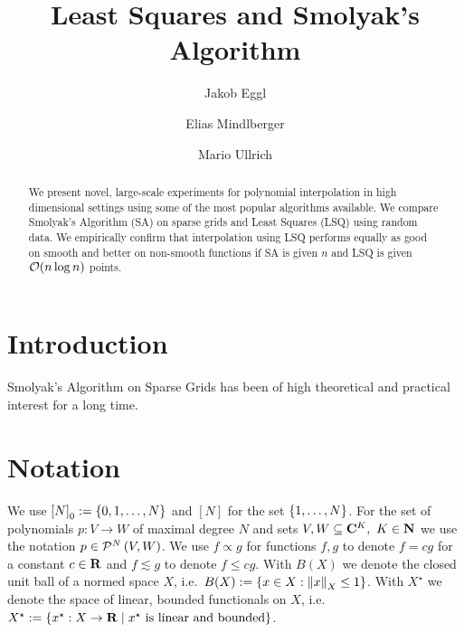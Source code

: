 \documentclass[12pt, oneside]{amsart}
\theoremstyle{definition}
\theoremstyle{remark}
\numberwithin{equation}{section}
\begin{document}
\title{Least Squares and Smolyak's Algorithm}


\author{Jakob Eggl}
\address{Institute of Analysis, Johannes Kepler University Linz, Austria.}

\author{Elias Mindlberger}
\address{Institute of Analysis, Johannes Kepler University Linz, Austria.}

\author{Mario Ullrich}
\address{Institute of Analysis, Johannes Kepler University Linz, Austria.}



\begin{abstract}
We present novel, large-scale experiments for polynomial interpolation in high dimensional settings using some of the most popular algorithms available. We compare Smolyak's Algorithm (SA) on sparse grids and Least Squares (LSQ) using random data. We empirically confirm that interpolation using LSQ performs equally as good on smooth and better on non-smooth functions if SA is given \(n\) and LSQ is given \(\cO(n \log n)\) points.
\end{abstract}


\maketitle
\thispagestyle{empty}


\tableofcontents

\newpage
\section{Introduction}
Smolyak's Algorithm on Sparse Grids has been of high theoretical and practical interest for a long time.


\section{Notation}


We use \({[N]}_0 \defn \set{0, 1, \dots, N}\) and \([N]\) for the set \(\set{1, \dots, N}\). For the set of polynomials \(p: V \to W\) of maximal degree \(N\) and sets \(V, W \subseteq \C^K,\ K \in \N\) we use the notation \(p \in \pols[N]{V, W}\). We use \(f \propto g\) for functions \(f, g\) to denote \(f = c g\) for a constant \(c \in \R\) and \(f \lesssim g\) to denote \(f \leq c g\). With \(B(X)\) we denote the closed unit ball of a normed space \(X\), i.e.\ \(B(X) \defn \set{x \in X: \norm[X]{x} \leq 1}\). With \(X^\star\) we denote the space of linear, bounded functionals on \(X\), i.e. \(X^\star \defn \set{x^\star: X \to \R \mid x^\star \text{ is linear and bounded}}\).
\end{document}
